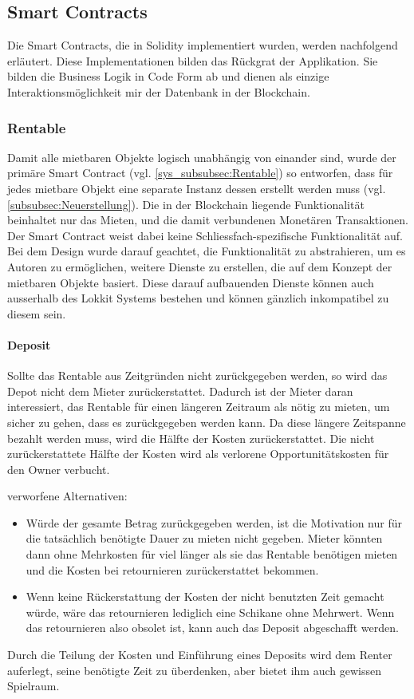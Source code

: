 \subsection{Smart Contracts}
\label{subsec:Smart_Contracts}
Die Smart Contracts, die in Solidity implementiert wurden, werden nachfolgend erläutert. Diese Implementationen bilden das Rückgrat der Applikation. Sie bilden die Business Logik in Code Form ab und dienen als einzige Interaktionsmöglichkeit mir der Datenbank in der Blockchain.\cite[Introduction to Smart Contracts]{solidity.readthedocs.io}

\subsubsection{Rentable}
\label{subsubsec:Rentable}
Damit alle mietbaren Objekte logisch unabhängig von einander sind, wurde der primäre Smart Contract (vgl. \ref{sys_subsubsec:Rentable}) so entworfen, dass für jedes mietbare Objekt eine separate Instanz dessen erstellt werden muss (vgl. \ref{subsubsec:Neuerstellung}). Die in der Blockchain liegende Funktionalität beinhaltet nur das Mieten, und die damit verbundenen Monetären Transaktionen. Der Smart Contract weist dabei keine Schliessfach-spezifische Funktionalität auf. Bei dem Design wurde darauf geachtet, die Funktionalität zu abstrahieren, um es Autoren zu ermöglichen, weitere Dienste zu erstellen, die auf dem Konzept der mietbaren Objekte basiert. Diese darauf aufbauenden Dienste können auch ausserhalb des Lokkit Systems bestehen und können gänzlich inkompatibel zu diesem sein.

\paragraph{Deposit}
Sollte das Rentable aus Zeitgründen nicht zurückgegeben werden, so wird das Depot nicht dem Mieter zurückerstattet. Dadurch ist der Mieter daran interessiert, das Rentable für einen längeren Zeitraum als nötig zu mieten, um sicher zu gehen, dass es zurückgegeben werden kann. Da diese längere Zeitspanne bezahlt werden muss, wird die Hälfte der Kosten zurückerstattet. Die nicht zurückerstattete Hälfte der Kosten wird als verlorene Opportunitätskosten für den Owner verbucht.

verworfene Alternativen:
\begin{itemize}
    \item Würde der gesamte Betrag zurückgegeben werden, ist die Motivation nur für die tatsächlich benötigte Dauer zu mieten nicht gegeben. Mieter könnten dann ohne Mehrkosten für viel länger als sie das Rentable benötigen mieten und die Kosten bei retournieren zurückerstattet bekommen.
    \item Wenn keine Rückerstattung der Kosten der nicht benutzten Zeit gemacht würde, wäre das retournieren lediglich eine Schikane ohne Mehrwert. Wenn das retournieren also obsolet ist, kann auch das Deposit abgeschafft werden.
\end{itemize}
Durch die Teilung der Kosten und Einführung eines Deposits wird dem Renter auferlegt, seine benötigte Zeit zu überdenken, aber bietet ihm auch gewissen Spielraum.

